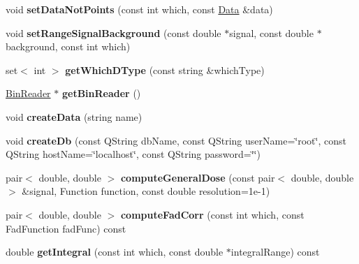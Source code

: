 \begin{DoxyCompactItemize}
\item 
\hypertarget{classDataHandle_a50550680c45eb39c456e189a622c284d}{void {\bfseries set\-Data\-Not\-Points} (const int which, const \hyperlink{classData}{Data} \&data)}\label{classDataHandle_a50550680c45eb39c456e189a622c284d}

\item 
\hypertarget{classDataHandle_a0e83770b88b152cb4e4f04658446e46d}{void {\bfseries set\-Range\-Signal\-Background} (const double $\ast$signal, const double $\ast$background, const int which)}\label{classDataHandle_a0e83770b88b152cb4e4f04658446e46d}

\item 
\hypertarget{classDataHandle_a1aee5afea4b6ad49fa6eeafa63696600}{set$<$ int $>$ {\bfseries get\-Which\-D\-Type} (const string \&which\-Type)}\label{classDataHandle_a1aee5afea4b6ad49fa6eeafa63696600}

\item 
\hypertarget{classDataHandle_a88984a5bf8769adecd11ec0df1dddce3}{\hyperlink{classBinReader}{Bin\-Reader} $\ast$ {\bfseries get\-Bin\-Reader} ()}\label{classDataHandle_a88984a5bf8769adecd11ec0df1dddce3}

\item 
\hypertarget{classDataHandle_a4ef0bd4b1ee9051b4a3d150b740dc6cd}{void {\bfseries create\-Data} (string name)}\label{classDataHandle_a4ef0bd4b1ee9051b4a3d150b740dc6cd}

\item 
\hypertarget{classDataHandle_a03cfb29618f9d46d4c1207ecfb9a743f}{void {\bfseries create\-Db} (const Q\-String db\-Name, const Q\-String user\-Name=\char`\"{}root\char`\"{}, const Q\-String host\-Name=\char`\"{}localhost\char`\"{}, const Q\-String password=\char`\"{}\char`\"{})}\label{classDataHandle_a03cfb29618f9d46d4c1207ecfb9a743f}

\item 
\hypertarget{classDataHandle_a5510a603caa75344006b1d8d74e801df}{pair$<$ double, double $>$ {\bfseries compute\-General\-Dose} (const pair$<$ double, double $>$ \&signal, Function function, const double resolution=1e-\/1)}\label{classDataHandle_a5510a603caa75344006b1d8d74e801df}

\item 
\hypertarget{classDataHandle_a9ee8fcf0076b08f37c6276cdc47a8973}{pair$<$ double, double $>$ {\bfseries compute\-Fad\-Corr} (const int which, const Fad\-Function fad\-Func) const }\label{classDataHandle_a9ee8fcf0076b08f37c6276cdc47a8973}

\item 
\hypertarget{classDataHandle_ae8f3562cfc85d429977c4fb6dc5559a1}{double {\bfseries get\-Integral} (const int which, const double $\ast$integral\-Range) const }\label{classDataHandle_ae8f3562cfc85d429977c4fb6dc5559a1}


\end{DoxyCompactItemize}
